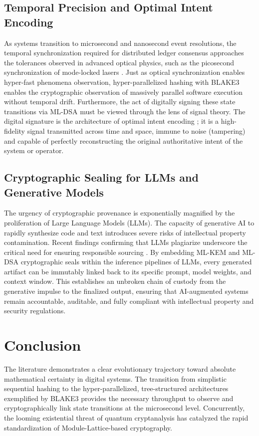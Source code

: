 \subsection{Temporal Precision and Optimal Intent Encoding}
As systems transition to microsecond and nanosecond event resolutions, the temporal synchronization required for distributed ledger consensus approaches the tolerances observed in advanced optical physics, such as the picosecond synchronization of mode-locked lasers \cite{ref_Picosecondsynch13}. Just as optical synchronization enables hyper-fast phenomena observation, hyper-parallelized hashing with BLAKE3 enables the cryptographic observation of massively parallel software execution without temporal drift. Furthermore, the act of digitally signing these state transitions via ML-DSA must be viewed through the lens of signal theory. The digital signature is the architecture of optimal intent encoding \cite{ref_SignalTheoryThe14}; it is a high-fidelity signal transmitted across time and space, immune to noise (tampering) and capable of perfectly reconstructing the original authoritative intent of the system or operator.

\subsection{Cryptographic Sealing for LLMs and Generative Models}
The urgency of cryptographic provenance is exponentially magnified by the proliferation of Large Language Models (LLMs). The capacity of generative AI to rapidly synthesize code and text introduces severe risks of intellectual property contamination. Recent findings confirming that LLMs plagiarize underscore the critical need for ensuring responsible sourcing \cite{ref_LLMsPlagiarizeE11}. By embedding ML-KEM and ML-DSA cryptographic seals within the inference pipelines of LLMs, every generated artifact can be immutably linked back to its specific prompt, model weights, and context window. This establishes an unbroken chain of custody from the generative impulse to the finalized output, ensuring that AI-augmented systems remain accountable, auditable, and fully compliant with intellectual property and security regulations.

\section{Conclusion}
\label{sec:crypto_prov_conclusion}

The literature demonstrates a clear evolutionary trajectory toward absolute mathematical certainty in digital systems. The transition from simplistic sequential hashing to the hyper-parallelized, tree-structured architectures exemplified by BLAKE3 provides the necessary throughput to observe and cryptographically link state transitions at the microsecond level. Concurrently, the looming existential threat of quantum cryptanalysis has catalyzed the rapid standardization of Module-Lattice-based cryptography.

